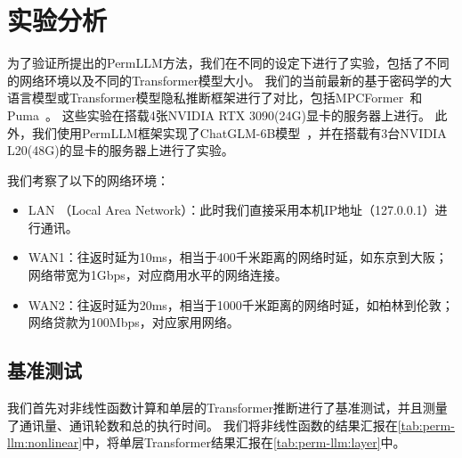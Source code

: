 \section{实验分析}
为了验证所提出的PermLLM方法，我们在不同的设定下进行了实验，包括了不同的网络环境以及不同的Transformer模型大小。
%
我们的当前最新的基于密码学的大语言模型或Transformer模型隐私推断框架进行了对比，包括MPCFormer~\cite{}和Puma~\cite{}。
%
这些实验在搭载4张NVIDIA RTX 3090(24G)显卡的服务器上进行。
%
此外，我们使用PermLLM框架实现了ChatGLM-6B模型~\cite{}，并在搭载有3台NVIDIA L20(48G)的显卡的服务器上进行了实验。
%

我们考察了以下的网络环境：
\begin{itemize}
    \item LAN （Local Area Network）：此时我们直接采用本机IP地址（127.0.0.1）进行通讯。
    \item WAN1：往返时延为10ms，相当于400千米距离的网络时延，如东京到大阪；网络带宽为1Gbps，对应商用水平的网络连接。
    \item WAN2：往返时延为20ms，相当于1000千米距离的网络时延，如柏林到伦敦；网络贷款为100Mbps，对应家用网络。
\end{itemize}


\subsection{基准测试}
我们首先对非线性函数计算和单层的Transformer推断进行了基准测试，并且测量了通讯量、通讯轮数和总的执行时间。
我们将非线性函数的结果汇报在\autoref{tab:perm-llm:nonlinear}中，将单层Transformer结果汇报在\autoref{tab:perm-llm:layer}中。
%

